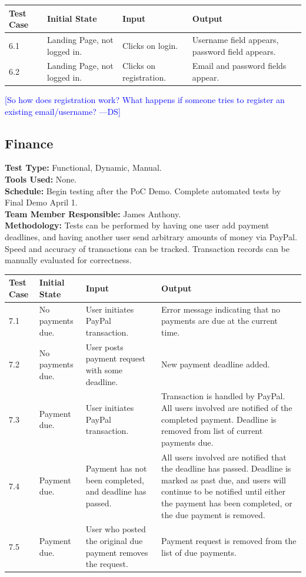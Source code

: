 \documentclass[12pt]{article}
\newcommand{\authornote}[3]{\textcolor{#1}{[#3 ---#2]}}
\newcommand{\authornote}[3]{}
\newcommand{\ds}[1]{\authornote{blue}{DS}{#1}}
\begin{document}
\begin{longtable}{|p{2cm}|p{3cm}|p{5cm}|p{5cm}|}
\hline
\textbf{Test Case}  & \textbf{Initial State} & \textbf{Input} & \textbf{Output} \\ \hline
6.1 & Landing Page, not logged in. & Clicks on login. & Username field appears, password field appears.\\
\hline
6.2 & Landing Page, not logged in. & Clicks on registration. & Email and password fields appear.\\
\hline
\end{longtable}

\ds{So how does registration work? What happens if someone tries to register an existing email/username?}

\subsection{Finance}
\textbf{Test Type:} Functional, Dynamic, Manual. \\
\textbf{Tools Used:} None. \\
\textbf{Schedule:} Begin testing after the PoC Demo. Complete automated tests by Final Demo April 1. \\
\textbf{Team Member Responsible:} James Anthony. \\
\textbf{Methodology:} Tests can be performed by having one user add payment deadlines, and having another user send arbitrary amounts of money via PayPal. Speed and accuracy of transactions can be tracked. Transaction records can be manually evaluated for correctness.

\begin{longtable}{|p{2cm}|p{3cm}|p{5cm}|p{5cm}|}
\hline
\textbf{Test Case} & \textbf{Initial State} & \textbf{Input} & \textbf{Output} \\ \hline
7.1 & No payments due. & User initiates PayPal transaction. & Error message indicating that no payments are due at the current time.\\
\hline
7.2 & No payments due. & User posts payment request with some deadline. & New payment deadline added.\\
\hline
7.3 & Payment due. & User initiates PayPal transaction. & Transaction is handled by PayPal. All users involved are notified of the completed payment. Deadline is removed from list of current payments due.\\
\hline
7.4 & Payment due. & Payment has not been completed, and deadline has passed. & All users involved are notified that the deadline has passed. Deadline is marked as past due, and users will continue to be notified until either the payment has been completed, or the due payment is removed.\\
\hline
7.5 & Payment due. & User who posted the original due payment removes the request. & Payment request is removed from the list of due payments.\\
\hline
\end{longtable}
\end{document}
